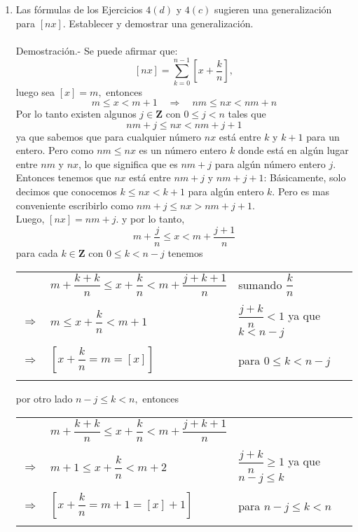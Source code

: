 \begin{enumerate}[ \bfseries 1.]
    \item  Las fórmulas de los Ejercicios $4(d)$ y $4(c)$ sugieren una generalización para $[nx]$. Establecer y demostrar una  generalización.\\\\
	Demostración.-\; Se puede afirmar que: $$[nx] =\sum\limits_{k=0}^{n-1} \left[ x + \dfrac{k}{n}\right],$$ luego sea $[x]=m,$ entonces $$m\leq x < m+1 \quad \Longrightarrow \quad nm \leq nx < nm+n$$ Por lo tanto existen algunos $j \in \mathbf{Z}$ con $0\leq j < n$ tales que $$nm+j\leq nx < nm + j + 1$$ ya que sabemos que para cualquier número $nx$ está entre $k$ y $k+1$ para un entero. Pero como $nm\leq nx$ es un número entero $k$ donde está en algún lugar entre $nm$ y $nx$, lo que significa que es $nm+j$ para algún número entero $j$. Entonces tenemos que $nx$ está entre $nm+j$ y $nm+j+1$: Básicamente, solo decimos que conocemos $k\leq nx<k+1$ para algún entero $k$. Pero es mas conveniente escribirlo como $nm+j\leq nx>nm+j+1$.\\
	Luego, $[nx]=nm+j$. y por lo tanto, $$m+\dfrac{j}{n}\leq x < m + \dfrac{j+1}{n}$$ 
	para cada $k\in \mathbf{Z}$ con $0\leq k <n-j$ tenemos
	\begin{center}
	    \begin{tabular}{cll}
		& $m+\dfrac{k+k}{n} \leq x + \dfrac{k}{n} < m + \dfrac{j+k+1}{n}$ & sumando $\dfrac{k}{n}$ \\\\
		 $\Longrightarrow$ & $m\leq x+\dfrac{k}{n}< m+1$ & $\dfrac{j+k}{n} <  1$ ya que $k<n-j$\\\\
		 $\Longrightarrow$ & $\left[x+\dfrac{k}{n}=m=[x]\right]$ & para $0\leq k < n-j$ \\\\
	    \end{tabular}
	\end{center}
	por otro lado $n-j\leq k < n,$ entonces
	\begin{center}
	    \begin{tabular}{cll}
		& $m+\dfrac{k+k}{n} \leq x + \dfrac{k}{n} < m + \dfrac{j+k+1}{n}$ & \\\\
		 $\Longrightarrow$ & $m+1\leq x+\dfrac{k}{n}< m+2$ & $\dfrac{j+k}{n} \geq  1$ ya que $n-j\leq k$\\\\
		 $\Longrightarrow$ & $\left[x+\dfrac{k}{n}=m+1=[x]+1\right]$ & para $n-j \leq k < n$ \\\\

\end{tabular}
\end{center}
\end{enumerate}
